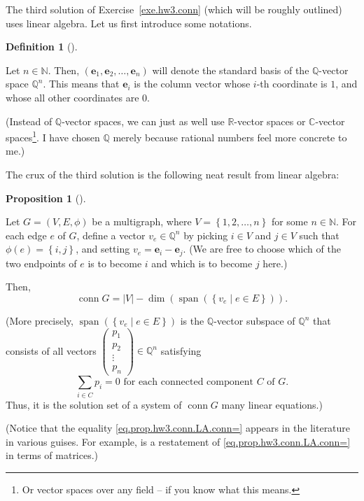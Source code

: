 \documentclass[numbers=enddot,12pt,final,onecolumn,notitlepage]{scrartcl}%
\theoremstyle{definition}
\newtheorem{prop}[theo]{Proposition}
\newenvironment{proposition}[1][]
{\begin{prop}[#1]\begin{leftbar}}
{\end{leftbar}\end{prop}}
\newtheorem{defi}[theo]{Definition}
\newenvironment{definition}[1][]
{\begin{defi}[#1]\begin{leftbar}}
{\end{leftbar}\end{defi}}
\let\sumnonlimits\sum
\renewcommand{\sum}{\sumnonlimits\limits}
\newcommand{\conn}{\operatorname{conn}}
\newcommand{\NN}{\mathbb{N}}
\newcommand{\QQ}{\mathbb{Q}}
\newcommand{\RR}{\mathbb{R}}
\newcommand{\set}[1]{\left\{ #1 \right\}}
\newcommand{\abs}[1]{\left| #1 \right|}
\newcommand{\tup}[1]{\left( #1 \right)}
\newcommand{\spann}[1]{\operatorname{span}\left( #1 \right)}
\begin{document}
The third solution of Exercise~\ref{exe.hw3.conn} (which will
be roughly outlined) uses linear algebra.
Let us first introduce some notations.

\begin{definition}
Let $n \in \NN$.
Then, $\tup{\mathbf{e}_1, \mathbf{e}_2, \ldots, \mathbf{e}_n}$
will denote the standard basis of the $\QQ$-vector space $\QQ^n$.
This means that $\mathbf{e}_i$ is the column vector whose $i$-th
coordinate is $1$, and whose all other coordinates are $0$.
\end{definition}

(Instead of $\QQ$-vector spaces, we can just as well use
$\RR$-vector spaces or $\mathbb{C}$-vector spaces\footnote{Or
  vector spaces over any field -- if you know what this means.}.
I have chosen $\QQ$ merely because rational numbers feel more
concrete to me.)

The crux of the third solution is the following neat result
from linear algebra:

\begin{proposition} \label{prop.hw3.conn.LA}
Let $G = \tup{V, E, \phi}$ be a multigraph, where
$V = \set{1, 2, \ldots, n}$ for some $n \in \NN$.
For each edge $e$ of $G$, define a vector $v_e \in \QQ^n$
by picking $i \in V$ and $j \in V$ such that
$\phi\tup{e} = \set{i, j}$, and setting
$v_e = \mathbf{e}_i - \mathbf{e}_j$.
(We are free to choose which of the two endpoints of $e$ is
to become $i$ and which is to become $j$ here.)

Then,
\begin{equation}
\conn G = \abs{V} - \dim \tup{\spann{\set{v_e \mid e \in E}}} .
\label{eq.prop.hw3.conn.LA.conn=}
\end{equation}

(More precisely, $\spann{\set{v_e \mid e \in E}}$ is the
$\QQ$-vector subspace of $\QQ^n$ that consists of all
vectors
$\left(
\begin{matrix} p_1 \\ p_2 \\ \vdots \\ p_n \end{matrix}
\right) \in \QQ^n$
satisfying
\[
 \sum_{i \in C} p_i = 0
 \text{ for each connected component } C \text{ of } G .
\]
Thus, it is the solution set of a system of $\conn G$
many linear equations.)
\end{proposition}

(Notice that the equality \eqref{eq.prop.hw3.conn.LA.conn=} appears
in the literature in various guises.
For example, \cite[Theorem 1.3.5]{Quinla17} is a restatement of
\eqref{eq.prop.hw3.conn.LA.conn=} in terms of matrices.)
\end{document}

